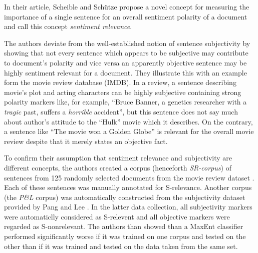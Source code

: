 \documentclass[a4paper,11pt]{article}
\begin{document}
In their article, Scheible and Sch\"utze propose a novel concept for
measuring the importance of a single sentence for an overall sentiment
polarity of a document and call this concept \textit{sentiment
  relevance}.

The authors deviate from the well-established notion of sentence
subjectivity by showing that not every sentence which appears to be
subjective may contribute to document's polarity and vice versa an
apparently objective sentence may be highly sentiment relevant for a
document.  They illustrate this with an example form the movie review
database (IMDB).  In a review, a sentence describing movie's plot and
acting characters can be highly subjective containing strong polarity
markers like, for example, ``Bruce Banner, a genetics researcher with
a \textit{tragic} past, suffers a \textit{horrible} accident'', but
this sentence does not say much about author's attitude to the
``Hulk'' movie which it describes.  On the contrary, a sentence like
``The movie won a Golden Globe'' is relevant for the overall movie
review despite that it merely states an objective fact.

To confirm their assumption that sentiment relevance and subjectivity
are different concepts, the authors created a corpus (henceforth
\textit{SR-corpus}) of sentences from 125 randomly selected documents
from the movie review dataset \cite{Pang-02}.  Each of these sentences
was manually annotated for S-relevance.  Another corpus (the
\textit{P\&L} corpus) was automatically constructed from the
subjectivity dataset provided by Pang and Lee \cite{Pang-Lee-04}.  In
the latter data collection, all subjectivity markers were automaticlly
considered as S-relevent and all objective markers were regarded as
S-nonrelevant.  The authors than showed than a MaxEnt classifier
performed significantly worse if it was trained on one corpus and
tested on the other than if it was trained and tested on the data
taken from the same set.
\end{document}
